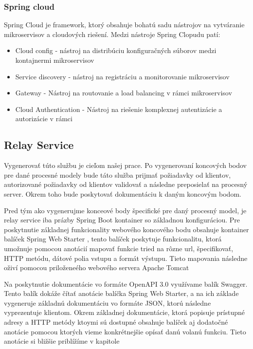   

\subsubsection{Spring cloud} 

 Spring Cloud je framework, ktorý obsahuje bohatú sadu nástrojov na vytváranie mikroservisov a cloudových riešení. Medzi nástroje Spring Clopudu patí:  

\begin{itemize} 

\item Cloud config - nástroj na distribúciu konfiguračných súborov medzi kontajnermi mikroservisov

\item Service discovery - nástroj na registráciu a monitorovanie mikroservisov 

\item Gateway - Nástroj na routovanie a load balancing v rámci mikroservisov 

\item Cloud Authentication - Nástroj na riešenie komplexnej autentizácie a autorizácie v rámci 

\end{itemize} 


\subsection{Relay Service}
Vygenerovať túto službu je cieľom našej prace. Po vygenerovaní koncových bodov pre dané procesné modely bude táto služba prijmať požiadavky od klientov, autorizované požiadavky od klientov validovať a následne preposielať na procesný server. Okrem toho bude poskytovať dokumentáciu k daným koncovým bodom.

Pred tým ako vygenerujme konceové body špecifické pre daný procesný model, je relay service iba prázby Spring Boot kontainer so základnou konfiguráciou. Pre poskytnutie základnej funkcionality webového koncového bodu obsahuje kontainer balíček Spring Web Starter \cite{webstarter}, tento balíček poskytuje funkcionalitu, ktorá umožnuje pomocou anotácií mapovať funkcie tried na rôzne \acrshort{url}, špecifikovať, HTTP metódu, dátové polia vstupu a formát výstupu. Tieto mapovania následne oživí pomocou priloženeého webového servera Apache Tomcat \cite{tomcat}


Na poskytnutie dokumentácie vo formáte OpenAPI 3.0 \cite{openapi3} využívame balík Swagger. Tento balík dokáže čítať anotácie balíčka Spring Web Starter, a na ich základe vygeneruje základnú dokumentáciu vo formáte JSON, ktorú následne vyprezentuje klientom. Okrem základnej dokumentácie, ktorá popisuje prístupné adresy a HTTP metódy ktoymi sú dostupné obsahuje balíček aj dodatočné anotácie pomocou ktorých vieme konkrétnejšie opísať danú volanú funkciu. Tieto anotácie si bližšie priblížíme v kapitole 

